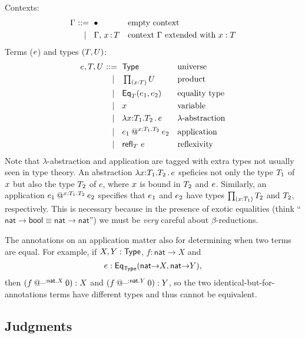 \documentclass{article}
\begin{document}
Contexts:
%
\begin{equation*}
  \Gamma
  \begin{aligned}[t]
    \ \mathrel{{:}{:}{=}}\    {}& \bullet & & \text{empty context}\\
    \ \mid\ \  {}& \Gamma,\, x\, {:}\, T & & \text{context $\Gamma$ extended with $x : T$}
  \end{aligned}
\end{equation*}
%
Terms ($e$) and types $(T, U)$:
%
\begin{equation*}
  e, T, U
  \begin{aligned}[t]
    \ \mathrel{{:}{:}{=}}\    {}& \mathsf{Type} & & \text{universe}\\
    \ \mid\ \  {}& \mathop{\textstyle\prod_{(x {:} T)}} U & & \text{product}\\
    \ \mid\ \  {}& \mathsf{Eq}_{T}(e_1,e_2) & & \text{equality type} \\
    \ \mid\ \  {}&  x   &&\text{variable} \\
    \ \mid\ \  {}&  \lambda x {:} T_1.{T_2}\,.\, e  &&\text{$\lambda$-abstraction} \\
    \ \mid\ \  {}&  e_1\mathbin{@^{x{:}T_1.T_2}} e_2  &&\text{application} \\
    \ \mid\ \  {}&  {\mathsf{refl}_{T}}\  e  &&\text{reflexivity} \\
  \end{aligned}
\end{equation*}
%
Note that $\lambda$-abstraction and application are tagged with extra types not usually
seen in type theory. An abstraction $\lambda x {:} T_1.{T_2}\,.\, e$ speficies not only the type
$T_1$ of $x$ but also the type $T_2$ of $e$, where $x$ is bound in $T_2$ and $e$.
Similarly, an application $e_1\mathbin{@^{x{:}T_1.T_2}} e_2$ specifies that $e_1$ and
$e_2$ have types $\mathop{\textstyle\prod_{(x {:} T_1)}} T_2$ and $T_2$, respectively. This is necessary
because in the presence of exotic equalities (think ``$\mathsf{nat} \to \mathsf{bool}
\equiv \mathsf{nat} \to \mathsf{nat}$'') we must be \emph{very} careful about
$\beta$-reductions.

The annotations on an application matter also for determining when two
terms are equal. For example, if $X,Y : \mathsf{Type}$, $f : \mathsf{nat}\to X$ and $$e
: \mathsf{Eq}_{\mathsf{Type}}(\mathsf{nat}{\to}X,\mathsf{nat}{\to}Y),$$ then
$(f\mathbin{@^{\_{:}\mathsf{nat}.X}} 0) : X$ and $(f\mathbin{@^{\_{:}\mathsf{nat}.Y}} 0) : Y$,
so the two identical-but-for-annotations terms have different types and thus
cannot be equivalent.

\subsection{Judgments}
\label{sec:judgments}
\end{document}
